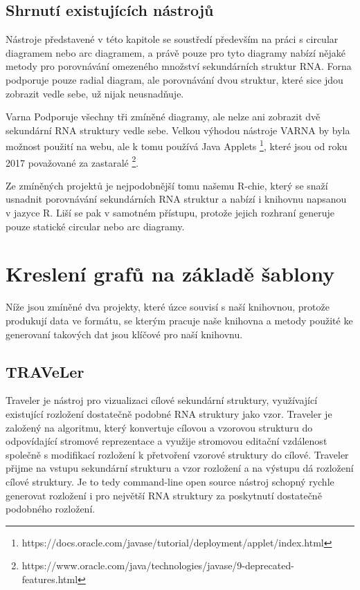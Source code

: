 \subsection{Shrnutí existujících nástrojů}

Nástroje představené v této kapitole se soustředí především na práci s circular
diagramem nebo arc diagramem, a právě pouze pro tyto diagramy nabízí nějaké
metody pro porovnávání omezeného množství sekundárních struktur RNA. Forna
podporuje pouze radial diagram, ale porovnávání dvou struktur, které sice jdou
zobrazit vedle sebe, už nijak neusnadňuje. 

Varna Podporuje všechny tři zmíněné diagramy, ale nelze ani zobrazit dvě
sekundární RNA struktury vedle sebe. Velkou výhodou nástroje VARNA by byla
možnost použití na webu, ale k tomu používá Java Applets
\footnote{https://docs.oracle.com/javase/tutorial/deployment/applet/index.html},
které jsou od roku 2017 považované za zastaralé
\footnote{https://www.oracle.com/java/technologies/javase/9-deprecated-features.html}.

Ze zmíněných projektů je nejpodobnější tomu našemu R-chie, který se snaží
usnadnit porovnávání sekundárních RNA struktur a nabízí i knihovnu napsanou v
jazyce R. Liší se pak v samotném přístupu, protože jejich rozhraní generuje
pouze statické circular nebo arc diagramy.

\section{Kreslení grafů na základě šablony}

Níže jsou zmíněné dva projekty, které úzce souvisí s naší knihovnou, protože
produkují data ve formátu, se kterým pracuje naše knihovna a metody
použité ke generovaní takových dat jsou klíčové pro naší knihovnu.

\subsection{TRAVeLer} 

Traveler\cite{Traveler2017} je nástroj pro vizualizaci cílové sekundární
struktury, využívající existující rozložení dostatečně podobné RNA struktury
jako vzor. Traveler je založený na algoritmu, který konvertuje cílovou a
vzorovou strukturu do odpovídající stromové reprezentace a využije stromovou
editační vzdálenost společně s modifikací rozložení k přetvoření vzorové
struktury do cílové. Traveler přijme na vstupu sekundární strukturu a vzor
rozložení a na výstupu dá rozložení cílové struktury. Je to tedy command-line
open source nástroj schopný rychle generovat rozložení i pro největší RNA
struktury za poskytnutí dostatečně podobného rozložení.


